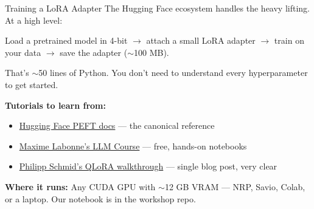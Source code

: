 \documentclass[aspectratio=169]{beamer}
\begin{document}
\begin{frame}{Training a LoRA Adapter}
    The Hugging Face ecosystem handles the heavy lifting. At a high level:

    \vspace{0.5em}
    Load a pretrained model in 4-bit $\rightarrow$ attach a small LoRA adapter $\rightarrow$ train on your data $\rightarrow$ save the adapter ($\sim$100 MB).

    \vspace{0.5em}
    That's $\sim$50 lines of Python. You don't need to understand every hyperparameter to get started.

    \vspace{0.7em}
    \textbf{Tutorials to learn from:}
    \begin{itemize}
        \vspace{0.2em}
        \item \href{https://huggingface.co/docs/peft}{Hugging Face PEFT docs} --- the canonical reference
        \item \href{https://github.com/mlabonne/llm-course}{Maxime Labonne's LLM Course} --- free, hands-on notebooks
        \item \href{https://www.philschmid.de/fine-tune-llms-in-2024-with-trl}{Philipp Schmid's QLoRA walkthrough} --- single blog post, very clear
    \end{itemize}

    \vspace{0.7em}
    \textbf{Where it runs:} Any CUDA GPU with $\sim$12 GB VRAM --- NRP, Savio, Colab, or a laptop. Our notebook is in the workshop repo.
\end{frame}
\end{document}
